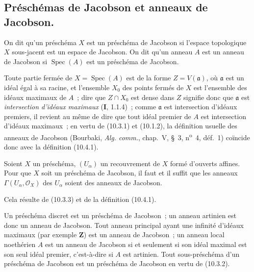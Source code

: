 \subsection{Préschémas de Jacobson et anneaux de Jacobson.}

\begin{definition}[10.4.1]
\label{IV.10.4.1-fr}
On dit qu'un préschéma $X$ est un préschéma de Jacobson si l'espace
topologique $X$ sous-jacent est un espace de Jacobson. On dit qu'un anneau
$A$ est un anneau de Jacobson si $\operatorname{Spec}(A)$ est un
préschéma de Jacobson.
\end{definition}

Toute partie fermée de $X=\operatorname{Spec}(A)$ est de la forme
$Z=V(\mathfrak a)$, où $\mathfrak a$ est un idéal égal à sa racine, et
l'ensemble $X_0$ des points fermés de $X$ est l'ensemble des idéaux maximaux
de $A$~; dire que $Z\cap X_0$ est dense dans $Z$ signifie donc que
$\mathfrak a$ est \emph{intersection d'idéaux maximaux} (\textbf{I}, 1.1.4)~;
comme $\mathfrak a$ est intersection d'idéaux premiers, il revient au même de
dire que tout idéal premier de $A$ est intersection d'idéaux maximaux~; en
vertu de (10.3.1) et (10.1.2), la définition usuelle des anneaux de Jacobson
(Bourbaki, \emph{Alg. comm.}, chap.~V, \S~3, n\textsuperscript{o}~4, déf.~1)
coïncide donc avec la définition (10.4.1).

\begin{proposition}[10.4.2]
\label{IV.10.4.2-fr}
Soient $X$ un préschéma, $(U_\alpha)$ un recouvrement de $X$ formé d'ouverts
affines. Pour que $X$ soit un préschéma de Jacobson, il faut et il suffit que
les anneaux $\Gamma(U_\alpha,\mathcal O_X)$ des $U_\alpha$ soient des anneaux
de Jacobson.
\end{proposition}

Cela résulte de (10.3.3) et de la définition (10.4.1).

\begin{env}[10.4.3]
\label{IV.10.4.3-fr}
Un préschéma discret est un préschéma de Jacobson~; un anneau artinien est donc
un anneau de Jacobson. Tout anneau principal ayant une infinité d'idéaux
maximaux (par exemple $\mathbf Z$) est un anneau de Jacobson~; un anneau local
noethérien $A$ est un anneau de Jacobson si et seulement si son idéal maximal
est son seul idéal premier, c'est-à-dire si $A$ est artinien. Tout
sous-préschéma d'un préschéma de Jacobson est un préschéma de Jacobson en vertu
de (10.3.2).
\end{env}

